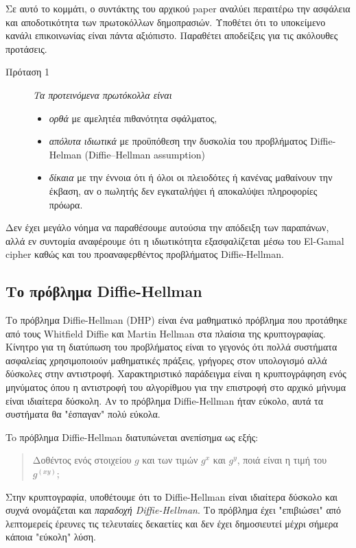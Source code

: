 \documentclass[a4paper,11pt]{article}
\begin{document}
Σε αυτό το κομμάτι, ο συντάκτης του αρχικού paper αναλύει περαιτέρω την ασφάλεια και αποδοτικότητα των πρωτοκόλλων δημοπρασιών. Υποθέτει ότι το
υποκείμενο κανάλι επικοινωνίας είναι πάντα αξιόπιστο. Παραθέτει αποδείξεις για τις ακόλουθες προτάσεις.

\begin{description}
	\item[Πρόταση 1] \emph{Τα προτεινόμενα πρωτόκολλα είναι}
		\begin{itemize}
			\item \emph{ορθά} με αμελητέα πιθανότητα σφάλματος,
			\item \emph{απόλυτα ιδιωτικά} με προϋπόθεση την δυσκολία του προβλήματος Diffie-Helman (Diffie–Hellman assumption) 
			\item \emph{δίκαια} με την έννοια ότι ή όλοι οι πλειοδότες ή κανένας μαθαίνουν την έκβαση, αν ο πωλητής δεν εγκαταλήψει ή αποκαλύψει
			πληροφορίες πρόωρα.
		\end{itemize}
\end{description}

Δεν έχει μεγάλο νόημα να παραθέσουμε αυτούσια την απόδειξη των παραπάνων, αλλά εν συντομία αναφέρουμε ότι η ιδιωτικότητα εξασφαλίζεται μέσω του
El-Gamal cipher καθώς και του προαναφερθέντος προβλήματος Diffie-Hellman.

\subsection{Το πρόβλημα Diffie-Hellman}

Το πρόβλημα Diffie-Hellman (DHP) είναι ένα μαθηματικό πρόβλημα που προτάθηκε από τους Whitfield Diffie και Martin Hellman στα πλαίσια της
κρυπτογραφίας. Κίνητρο για τη διατύπωση του προβλήματος είναι το γεγονός ότι πολλά συστήματα ασφαλείας χρησιμοποιούν μαθηματικές πράξεις, γρήγορες
στον υπολογισμό αλλά δύσκολες στην αντιστροφή. Χαρακτηριστικό παράδειγμα είναι η κρυπτογράφηση ενός μηνύματος όπου η αντιστροφή του αλγορίθμου για
την επιστροφή στο αρχικό μήνυμα είναι ιδιαίτερα δύσκολη. Αν το πρόβλημα Diffie-Hellman ήταν εύκολο, αυτά τα συστήματα θα "έσπαγαν" πολύ εύκολα.

To πρόβλημα Diffie-Hellman διατυπώνεται ανεπίσημα ως εξής:

 \begin{quote} Δοθέντος ενός στοιχείου $g$ και των τιμών $g^x$ και $g^y$, ποιά είναι η τιμή του $g^(xy)$; \end{quote}

Στην κρυπτογραφία, υποθέτουμε ότι το Diffie-Hellman είναι ιδιαίτερα δύσκολο και συχνά ονομάζεται και \emph{παραδοχή Diffie-Hellman}. Το πρόβλημα
έχει "επιβιώσει" από λεπτομερείς έρευνες τις τελευταίες δεκαετίες και δεν έχει δημοσιευτεί μέχρι σήμερα κάποια "εύκολη" λύση.
\end{document}
